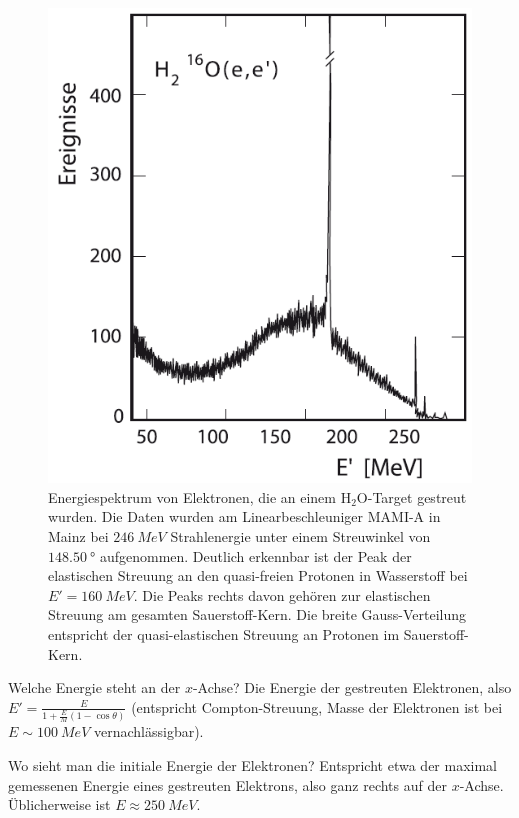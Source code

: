\begin{figure}[htb]
    \centering
    \includegraphics[width=0.5\linewidth]{img/povh_6_5.png}
    \caption{Energiespektrum von Elektronen, die an einem $\text{H}_2$O-Target gestreut wurden. 
    Die Daten wurden am Linearbeschleuniger MAMI-A in Mainz bei $\SI{246}{MeV}$ Strahlenergie unter einem Streuwinkel von $\SI{148.50}{\degree}$ aufgenommen.
    Deutlich erkennbar ist der Peak der elastischen Streuung an den quasi-freien Protonen in Wasserstoff bei $E' = \SI{160}{MeV}$. 
    Die Peaks rechts davon gehören zur elastischen Streuung am gesamten Sauerstoff-Kern. 
    Die breite Gauss-Verteilung entspricht der quasi-elastischen Streuung an Protonen im Sauerstoff-Kern. }
    \label{fig:povh65}
\end{figure}
% 
% 
\begin{fquestion}{Welche Energie steht an der $x$-Achse?}
    Die Energie der gestreuten Elektronen, also $E' = \frac{E}{1 + \frac{E}{M}(1-\cos \theta)}$ (entspricht Compton-Streuung, Masse der Elektronen ist bei $E\sim \SI{100}{MeV}$ vernachlässigbar).
\end{fquestion}

\begin{fquestion}{Wo sieht man die initiale Energie der Elektronen?}
    Entspricht etwa der maximal gemessenen Energie eines gestreuten Elektrons, also ganz rechts auf der $x$-Achse.
    Üblicherweise ist $E \approx \SI{250}{MeV}$.
\end{fquestion}

